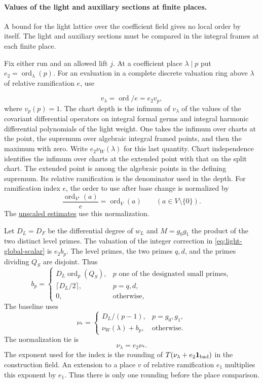 \paragraph{Values of the light and auxiliary sections at finite places.}
\label{par:slice-finite-depth}

A bound for the light lattice over the coefficient field gives no local order by itself. The light and auxiliary sections must be compared in the integral frames at each finite place.

Fix either run and an allowed lift \(j\). At a coefficient place
\(\lambda\mid p\) put \(e_2=\operatorname{ord}_{\lambda}(p)\).
For an evaluation in a complete discrete valuation ring above
\(\lambda\) of relative ramification \(e\), use

\[
  v_\lambda=\operatorname{ord}/e=e_2v_p,
\]
 where \(v_p(p)=1\).
The chart depth is the infimum of \(v_\lambda\) of the values of the covariant differential operators on integral formal germs and integral harmonic
differential polynomials of the light weight. One takes the
infimum over charts at the point, the supremum over algebraic
integral framed points, and then the maximum with zero. Write
\(e_2\nu_W(\lambda)\) for this last quantity. Chart independence
identifies the infimum over charts at the extended point with
that on the split chart. The extended point is among the
algebraic points in the defining supremum. Its relative
ramification is the denominator used in the depth.
For ramification index \(e\), the order to use after base change is normalized by
\[
  \frac{\operatorname{ord}_{V'}(a)}{e}=\operatorname{ord}_{V}(a)\qquad(a\in V\setminus\{0\}).
\]
The \hyperref[par:unscaled-light-depth]{unscaled estimates}
use this normalization. \label{cor:slice-finite-depth-1}

Let \(D_L=D_F\) be the differential degree of \(w_L\) and
\(M=g_0g_1\) the product of the two distinct level primes.
The valuation of the integer correction in
\eqref{eq:light-global-scalar} is \(e_2 b_p\). The level
primes, the two primes \(q,d\), and the primes dividing
\(Q_S\) are disjoint. Thus
\[
 b_p=
 \begin{cases}
 D_L\operatorname{ord}_p(Q_S),&p\text{ one of the designated small primes},\\
 \lceil D_L/2\rceil,&p=q,d,\\
 0,&\text{otherwise},
 \end{cases}
\]
The baseline uses
\[
 \nu_*=
 \begin{cases}
 D_L/(p-1),&p=g_0,g_1,\\
 \nu_W(\lambda)+b_p,&\text{otherwise}.
 \end{cases}
\]
The normalization tie is
\begin{equation}\label{eq:slice-finite-baseline}
                     \nu_\lambda=e_2\nu_* .
\end{equation}
The exponent used for the index is the rounding of
\(T(\nu_\lambda+e_2{\bf1}_{\rm bad})\) in the construction
field. An extension to a place \(v\) of relative ramification
\(e_1\) multiplies this exponent by \(e_1\). Thus there is
only one rounding before the place comparison.
\label{cor:slice-finite-depth-2}

